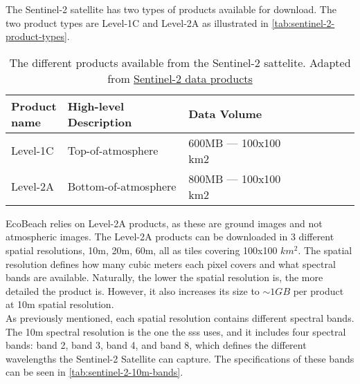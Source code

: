 The Sentinel-2 satellite has two types of products available for download. The two product types are Level-1C and Level-2A as illustrated in \autoref{tab:sentinel-2-product-types}.

\begin{table}[h!]
    \centering
    \begin{tabular}{| p{0.15\linewidth} | p{0.35\linewidth} | p{0.35\linewidth} |p{0.15\linewidth} |}
        \hline
        \textbf{Product name} & \textbf{High-level Description} & \textbf{Data Volume} \\ \hline
        Level-1C              & Top-of-atmosphere               & 600MB — 100x100 km2  \\\hline
        Level-2A              & Bottom-of-atmosphere            & 800MB — 100x100 km2  \\\hline
    \end{tabular}
    \caption{The different products available from the Sentinel-2 sattelite. Adapted from \href{https://sentinels.copernicus.eu/web/sentinel/missions/sentinel-2/data-products}{Sentinel-2 data products}}
    \label{tab:sentinel-2-product-types}
\end{table}

EcoBeach relies on Level-2A products, as these are ground images and not atmospheric images. The Level-2A products can be downloaded in 3 different spatial resolutions, 10m, 20m, 60m, all as tiles covering 100x100 $km^2$. The spatial resolution defines how many cubic meters each pixel covers and what spectral bands are available. Naturally, the lower the spatial resolution is, the more detailed the product is. However, it also increases its size to $\sim 1GB$ per product at 10m spatial resolution. \\

As previously mentioned, each spatial resolution contains different spectral bands. The 10m spectral resolution is the one the \acrshort{sss} uses, and it includes four spectral bands: band 2, band 3, band 4, and band 8, which defines the different wavelengths the Sentinel-2 Satellite can capture. The specifications of these bands can be seen in \autoref{tab:sentinel-2-10m-bands}.
\cite{sentinel-2-product-specification}

